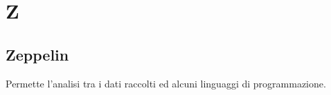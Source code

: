 \section*{Z}

\subsection{Zeppelin}
Permette l'analisi tra i dati raccolti ed alcuni linguaggi di programmazione.